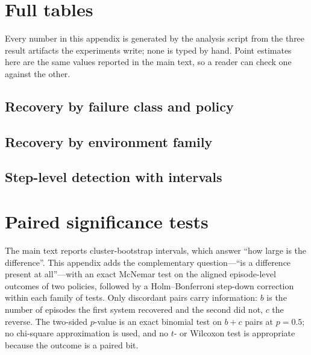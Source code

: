 \appendix

\section{Full tables}\label{app:full}

Every number in this appendix is generated by the analysis script from the three result
artifacts the experiments write; none is typed by hand. Point estimates here are the same
values reported in the main text, so a reader can check one against the other.

\subsection{Recovery by failure class and policy}



\subsection{Recovery by environment family}



\subsection{Step-level detection with intervals}\label{app:detection}





\section{Paired significance tests}\label{app:tests}

The main text reports cluster-bootstrap intervals, which answer ``how large is the
difference''. This appendix adds the complementary question---``is a difference present at
all''---with an exact McNemar test on the aligned episode-level outcomes of two policies,
followed by a Holm--Bonferroni step-down correction within each family of tests. Only
discordant pairs carry information: $b$ is the number of episodes the first system recovered
and the second did not, $c$ the reverse. The two-sided $p$-value is an exact binomial test on
$b+c$ pairs at $p=0.5$; no chi-square approximation is used, and no $t$- or Wilcoxon test is
appropriate because the outcome is a paired bit.

